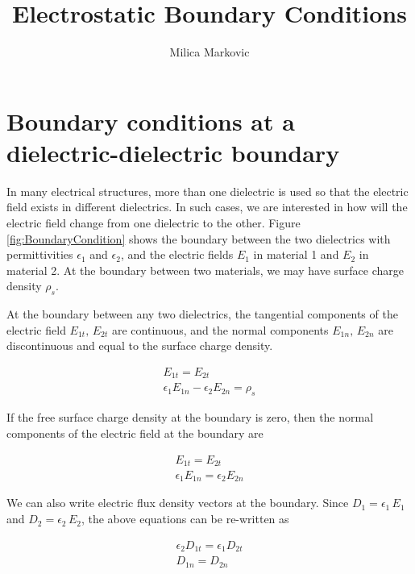 \documentclass{ximera}
\title{Electrostatic Boundary Conditions}
\author{Milica Markovic}
\begin{document}
  
\begin{abstract}  

\end{abstract}  
\maketitle    


\section{Boundary conditions at a dielectric-dielectric boundary}



In many electrical structures, more than one dielectric is used so that the electric field exists in different dielectrics. In such cases, we are interested in how will the electric field change from one dielectric to the other. Figure \ref{fig:BoundaryCondition} shows the boundary between the two dielectrics with permittivities $\epsilon_1$ and $\epsilon_2$, and the electric fields $E_1$ in material 1 and $E_2$ in material 2. At the boundary between two materials, we may have surface charge density $\rho_s$.

At the boundary between any two dielectrics, the tangential components of the electric field $E_{1t}, \, E_{2t}$ are continuous, and the normal components $E_{1n}, \, E_{2n}$ are discontinuous and equal to the surface charge density.  


\begin{eqnarray}
E_{1t}=E_{2t} \\
\epsilon_1 E_{1n}-\epsilon_2 E_{2n}=\rho_s 
\end{eqnarray} 

If the free surface charge density at the boundary is zero, then the normal components of the electric field at the boundary are


\begin{eqnarray}
E_{1t}=E_{2t} \\
\epsilon_1 E_{1n}=\epsilon_2 E_{2n}
\end{eqnarray} 


We can also write electric flux density vectors at the boundary. Since     
 $D_1=\epsilon_1 \,E_1$ and   $D_{2}=\epsilon_2 \,E_{2}$, the above equations can be re-written as


\begin{eqnarray}
\epsilon_2 D_{1t}=\epsilon_1 D_{2t}  \\
D_{1n}=D_{2n}
\end{eqnarray} 
\end{document}
